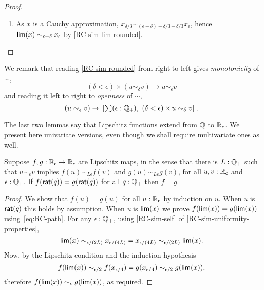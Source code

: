 \begin{proof}
\begin{enumerate}
  \item As $x$ is a Cauchy approximation, $x_{\delta/3} \sim_{(\epsilon + \delta) -
      \delta/3 - \delta/3} x_\epsilon$, hence $\mathsf{lim}(x) \sim_{\epsilon + \delta}
    x_\epsilon$ by \autoref{RC-sim-lim-rounded}.
  \end{enumerate}
\end{proof}

\noindent
We remark that reading \autoref{RC-sim-rounded} from right to left gives
\emph{monotonicity} of $\sim$,
%
\begin{equation*}
  (\delta < \epsilon) \times (u \sim_\delta v) \to u \sim_\epsilon v
\end{equation*}
%
and reading it left to right to \emph{openness} of $\sim$,
%
\begin{equation*}
  (u \sim_\epsilon v) \to \brck{\sm{\epsilon : \Qp} (\delta < \epsilon) \times u \sim_\delta v}.
\end{equation*}

The last two lemmas say that Lipschitz functions extend from $\mathbb{Q}$ to $\mathbb{R}_\mathsf{c}$. We present
here univariate versions, even though we shall require multivariate ones as well.

\begin{lem} \label{RC-Lipschitz-eq}
  Suppose $f,g : \mathbb{R}_\mathsf{c} \to \mathbb{R}_\mathsf{c}$ are Lipschitz maps, in the sense that there is $L : \mathbb{Q}_{+}$
  such that $u \sim_\epsilon v$ implies $f(u) \sim_{L \epsilon} f(v)$ and $g(u) \sim_{L
    \epsilon} g(v)$, for all $u, v : \mathbb{R}_\mathsf{c}$ and $\epsilon : \mathbb{Q}_{+}$. If $f(\mathsf{rat}(q)) =
  g(\mathsf{rat}(q))$ for all $q : \mathbb{Q}_{+}$ then $f = g$.
\end{lem}

\begin{proof}
  We show that $f(u) = g(u)$ for all $u : \mathbb{R}_\mathsf{c}$ by induction on $u$. When $u$ is
  $\mathsf{rat}(q)$ this holds by assumption. When $u$ is $\mathsf{lim}(x)$ we prove $f(\mathsf{lim}(x)) =
  g(\mathsf{lim}(x))$ using~\eqref{eq:RC-path}. For any $\epsilon : \mathbb{Q}_{+}$, using
  \autoref{RC-sim-self} of \autoref{RC-sim-uniformity-properties},
  \begin{equation*}
    \mathsf{lim}(x) \sim_{\epsilon/(2 L)}
    x_{\epsilon/(4 L)} =
    x_{\epsilon/(4 L)} \sim_{\epsilon/(2 L)}
    \mathsf{lim}(x).
  \end{equation*}
  Now, by the Lipschitz condition and the induction hypothesis
  \begin{equation*}
    f(\mathsf{lim}(x)) \sim_{\epsilon/2}
    f(x_{\epsilon/4}) =
    g(x_{\epsilon/4}) \sim_{\epsilon/2}
    g(\mathsf{lim}(x)),
  \end{equation*}
  therefore $f(\mathsf{lim}(x)) \sim_\epsilon g(\mathsf{lim}(x))$, as required.
\end{proof}

